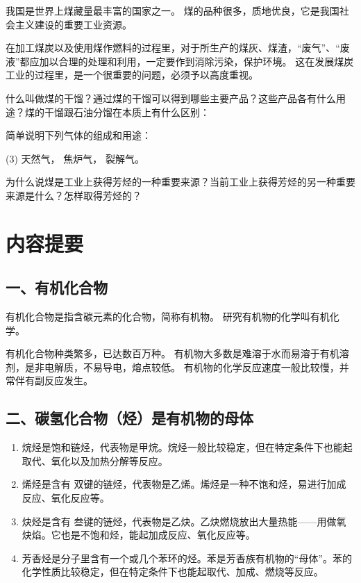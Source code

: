 我国是世界上煤藏量最丰富的国家之一。
煤的品种很多，质地优良，它是我国社会主义建设的重要工业资源。

在加工煤炭以及使用煤作燃料的过程里，对于所生产的煤灰、煤渣，“废气”、“废液”都应加以合理的处理和利用，一定要作到消除污染，保护环境。
这在发展煤炭工业的过程里，是一个很重要的问题，必须予以高度重视。

\begin{Practice}[习题]
\begin{question}
  \item 什么叫做煤的干馏？通过煤的干馏可以得到哪些主要产品？这些产品各有什么用途？煤的干馏跟石油分馏在本质上有什么区别：
  \item 简单说明下列气体的组成和用途：
  \begin{tasks}(3)
    \task 天然气，
    \task 焦炉气，
    \task 裂解气。
  \end{tasks}
  \item 为什么说煤是工业上获得芳烃的一种重要来源？当前工业上获得芳烃的另一种重要来源是什么？怎样取得芳烃的？
\end{question}
\end{Practice}

\section*{内容提要}
\setcounter{subsection}{0}
\subsection*{一、有机化合物}
有机化合物是指含碳元素的化合物，简称有机物。
研究有机物的化学叫有机化学。

有机化合物种类繁多，已达数百万种。
有机物大多数是难溶于水而易溶于有机溶剂，是非电解质，不易导电，熔点较低。
有机物的化学反应速度一般比较慢，并常伴有副反应发生。

\subsection*{二、碳氢化合物（烃）是有机物的母体}
\begin{enumerate}[1.]
  \item 烷烃是饱和链烃，代表物是甲烷。烷烃一般比较稳定，但在特定条件下也能起取代、氧化以及加热分解等反应。
  \item 烯烃是含有  双键的链烃，代表物是乙烯。烯烃是一种不饱和烃，易进行加成反应、氧化反应等。
  \item 炔烃是含有  叁键的链烃，代表物是乙炔。乙炔燃烧放出大量热能——用做氧炔焰。它也是不饱和烃，能起加成反应、氧化反应等。
  \item 芳香烃是分子里含有一个或几个苯环的烃。苯是芳香族有机物的“母体”。苯的化学性质比较稳定，但在特定条件下也能起取代、加成、燃烧等反应。
\end{enumerate}

